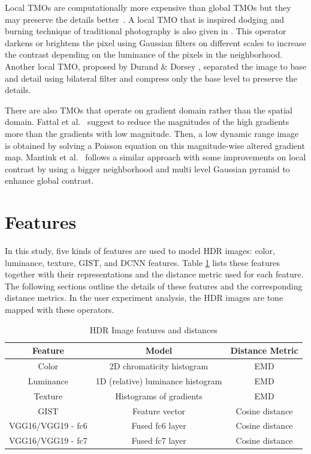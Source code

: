 Local TMOs are computationally more expensive than global TMOs but they may preserve the details better~\cite{Rein2010}. A local TMO that is inspired dodging and burning technique of traditional photography is also given in \cite{reinhard2002photographic}. This operator darkens or brightens the pixel using Gaussian filters on different scales to increase the contrast  depending on the luminance of the pixels in the neighborhood. Another local TMO, proposed by Durand \& Dorsey \cite{durand2002fast}, separated the image to base and detail using bilateral filter and compress only the base level to preserve the details. 

There are also TMOs that operate on gradient domain rather than the spatial domain. Fattal et al.~\cite{fattal2002gradient} suggest to reduce the magnitudes of the high gradients more than the gradients with low magnitude. Then, a low dynamic range image is obtained by solving a Poisson equation on this magnitude-wise altered gradient map. Mantiuk et al.~\cite{mantiuk2006perceptual} follows a similar approach with some improvements on local contrast by using a bigger neighborhood and multi level Gaussian pyramid to enhance global contrast.


\section{Features}
\label{sec:features}
In this study, five kinds of features are used to model HDR images: color, luminance, texture, GIST, and DCNN features. Table \ref{tab:table_feature} lists these features together with their representations and the distance metric used for each feature. The following sections outline the details of these features and the corresponding distance metrics. In the user experiment analysis, the HDR images are tone mapped with these operators.

\begin{table}
\caption{HDR Image features and distances}
\centering
\begin{tabular}{c|c|c}
\label{tab:table_feature}
\textbf{Feature} & \textbf{Model} & \textbf{Distance Metric}\\
\hline
Color  & 2D chromaticity histogram & EMD \\
Luminance  & 1D (relative) luminance histogram & EMD \\
Texture  & Histograms of gradients & EMD \\
GIST  & Feature vector & Cosine distance \\
VGG16/VGG19 - fc6 & Fused fc6 layer & Cosine distance  \\
VGG16/VGG19 - fc7 & Fused fc7 layer & Cosine distance
\end{tabular}
\end{table}


